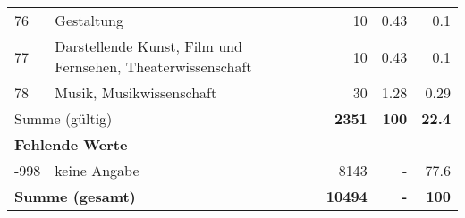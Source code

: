 \begin{longtable}{lXrrr}
        76 & \multicolumn{1}{X}{Gestaltung} & %
          \num{10} &
          \num[round-mode=places,round-precision=2]{0,43} &
          \num[round-mode=places,round-precision=2]{0,1} \\

        77 & \multicolumn{1}{X}{Darstellende Kunst, Film und Fernsehen, Theaterwissenschaft} & %
          \num{10} &
          \num[round-mode=places,round-precision=2]{0,43} &
          \num[round-mode=places,round-precision=2]{0,1} \\

        78 & \multicolumn{1}{X}{Musik, Musikwissenschaft} & %
          \num{30} &
          \num[round-mode=places,round-precision=2]{1,28} &
          \num[round-mode=places,round-precision=2]{0,29} \\

     \midrule
     \multicolumn{2}{l}{Summe (gültig)} &
       \textbf{\num{2351}} &
     \textbf{100} &
       \textbf{\num[round-mode=places,round-precision=2]{22,4}} \\
     \multicolumn{5}{l}{\textbf{Fehlende Werte}}\\
       -998 &
       keine Angabe &
         \num{8143} &
        - &
         \num[round-mode=places,round-precision=2]{77,6} \\
     \midrule
     \multicolumn{2}{l}{\textbf{Summe (gesamt)}} &
          \textbf{\num{10494}} &
        \textbf{-} &
        \textbf{100} \\
     \bottomrule
     \end{longtable}
     
